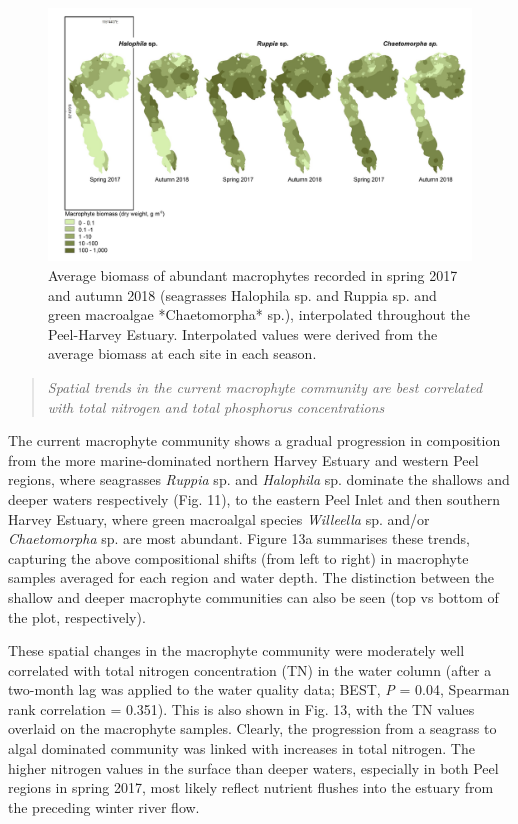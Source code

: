 \documentclass[
]{book}
\begin{document}
\begin{figure}
\includegraphics[width=1\linewidth]{images/macrophytes/picture16} \caption{Average biomass of abundant macrophytes recorded in spring 2017 and autumn 2018 (seagrasses Halophila sp. and Ruppia sp. and green macroalgae *Chaetomorpha* sp.), interpolated throughout the Peel-Harvey Estuary. Interpolated values were derived from the average biomass at each site in each season.}\label{fig:macrophytes-pic16}
\end{figure}

\begin{quote}
\emph{Spatial trends in the current macrophyte community are best correlated with total nitrogen and total phosphorus concentrations}
\end{quote}

The current macrophyte community shows a gradual progression in composition from the more marine-dominated northern Harvey Estuary and western Peel regions, where seagrasses \emph{Ruppia} sp. and \emph{Halophila} sp. dominate the shallows and deeper waters respectively (Fig. 11), to the eastern Peel Inlet and then southern Harvey Estuary, where green macroalgal species \emph{Willeella} sp. and/or \emph{Chaetomorpha} sp. are most abundant. Figure 13a summarises these trends, capturing the above compositional shifts (from left to right) in macrophyte samples averaged for each region and water depth. The distinction between the shallow and deeper macrophyte communities can also be seen (top vs bottom of the plot, respectively).

These spatial changes in the macrophyte community were moderately well correlated with total nitrogen concentration (TN) in the water column (after a two-month lag was applied to the water quality data; BEST, \emph{P} = 0.04, Spearman rank correlation = 0.351). This is also shown in Fig. 13, with the TN values overlaid on the macrophyte samples. Clearly, the progression from a seagrass to algal dominated community was linked with increases in total nitrogen. The higher nitrogen values in the surface than deeper waters, especially in both Peel regions in spring 2017, most likely reflect nutrient flushes into the estuary from the preceding winter river flow.
\end{document}
